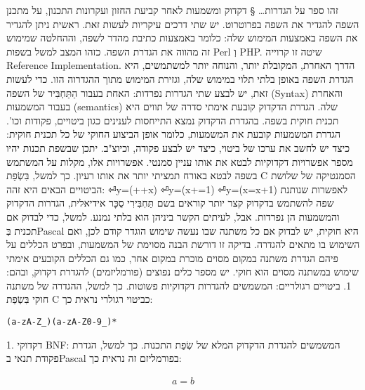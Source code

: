 \begin{טבלא}[!htbp]
      זהו ספר על הגדרות…
      § דקדוק ומשמעות
      לאחר קביעת החזון ועקרונות התכנון, על מתכנן השפה להגדיר את השפה בפרוטרוט. יש שתי דרכים עיקריות לעשות זאת. ראשית ניתן להגדיר את השפה באמצעות המימוש שלה: כלומר באמצעות כתיבת מהדר לשפה, וההחלטה שמימוש זה מהווה את הגדרת השפה. כזהו המצב למשל בשפות Perl וְ PHP. שיטה זו קרוייה Reference Implementation.
      הדרך האחרת, המקובלת יותר, והנוחה יותר למשתמשים, היא הגדרת השפה באופן בלתי תלוי במימוש שלה, וגזירת המימוש מתוך ההגדרוה הזו. כדי לעשות זאת, יש לבצע שתי הגדרות נפרדות: האחת בעבור הַתַּחְבִּיר של השפה (Syntax) והאחרת בעבור המשמעות (semantics) שלה.
      הגדרת הדקדוק קובעת אימתי סדרה של תווים היא תכנית חוקית בשפה. בהגדרת הדקדוק נמצא התייחסות לענינים כגון ביטויים, פקודות וכו'. הגדרת המשמעות קובעת את המשמעות, כלומר אופן הביצוע החוקי של כל תכנית חוקית: כיצד יש לחשב את ערכו של ביטוי, כיצד יש לבצע פקודה, וכיוצ"ב.
      יתכן שבשפת תכנות יהיו מספר אפשרויות דקדוקיות לבטא את אותו עניין סמנטי. אפשרויות אלו, מקלות על המשתמש בשפה לבטא באורח תמציתי יותר את אותו רעיון. כך למשל, בִּשְׂפַת C הסמנטיקה של שלושת הביטויים הבאים היא זהה:
⏎y=(++x)
⏎y=(x+=1)
⏎y=(x=x+1)
      לאפשרות שנותנת שפה להשתמש בדקדוק קצר יותר קוראים בשם תַּחְבִּירִי סֻכָּר
      אידיאלית, הגדרות הדקדוק והמשמעות הן נפרדות. אבל, לעיתים הקשר ביניהן הוא בלתי נמנע. למשל, כדי לבדוק אם תכנית בְּPascal היא חוקית, יש לבדוק אם כל משתנה שבו נעשה שימוש הוגדר קודם לכן, ואם השימוש בו מתאים להגדרה. בדיקה זו דורשת הבנה מסוימת של המשמעות, ובפרט הכללים על פיהם הגדרת משתנה במקום מסוים מוכרת במקום אחר, כמו גם הכללים הקובעים אימתי שימוש במשתנה מסוים הוא חוקי.
      יש מספר כלים נפוצים (פורמליזמים) להגדרת דקדוק, ובהם:
      1. ביטויים רגולריים: המשמשים להגדרות דקדוקיות פשוטות. כך למשל, ההגדרה של משתנה חוקי בִּשְׂפַת C כביטוי רגולרי נראית כך:

\begin{verbatim}
(a-zA-Z_)(a-zA-Z0-9_)*
\end{verbatim}
      1. דקדוקי BNF: המשמשים להגדרת הדקדוק המלא של שְׂפַת התכנות. כך למשל, הגדרת פקודת תנאי בPascal בפורמליזם זה נראית כך:

      \begin{align}
        a=b
      \end{align}



\end{טבלא}
